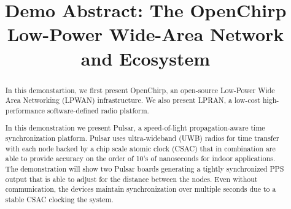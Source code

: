 \documentclass[conference]{IEEEtran}
\begin{document}
\title{Demo Abstract: The OpenChirp Low-Power Wide-Area Network and Ecosystem}
\author{
}


% 








\maketitle

\begin{abstract}

In this demonstartion, we first present OpenChirp, an open-source Low-Power Wide
Area Networking (LPWAN) infrastructure.
We also present LPRAN, a low-cost high-performance software-defined radio
platform.


In this demonstration we present Pulsar, a speed-of-light propagation-aware
time synchronization platform. Pulsar uses ultra-wideband (UWB) radios for
time transfer with each node backed by a chip scale atomic clock (CSAC) that
in combination are able to provide accuracy on the order of 10's of
nanoseconds for indoor applications. The demonstration will show two Pulsar
boards generating a tightly synchronized PPS output that is able to adjust for
the distance between the nodes. Even without communication, the devices
maintain synchronization over multiple seconds due to a stable CSAC clocking
the system.
\end{abstract}
\end{document}
